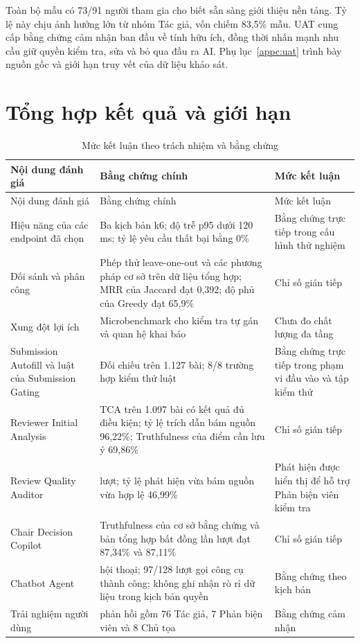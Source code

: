 Toàn bộ mẫu có 73/91 người tham gia cho biết sẵn sàng giới thiệu nền tảng. Tỷ lệ này chịu ảnh hưởng lớn từ nhóm Tác giả, vốn chiếm 83,5\% mẫu. UAT cung cấp bằng chứng cảm nhận ban đầu về tính hữu ích, đồng thời nhấn mạnh nhu cầu giữ quyền kiểm tra, sửa và bỏ qua đầu ra AI. Phụ lục~\ref{appc:uat} trình bày nguồn gốc và giới hạn truy vết của dữ liệu khảo sát.

\section{Tổng hợp kết quả và giới hạn}

\begin{longtable}{|>{\RaggedRight\arraybackslash}p{}|>{\RaggedRight\arraybackslash}p{}|>{\RaggedRight\arraybackslash}p{}|}
  \caption{Mức kết luận theo trách nhiệm và bằng chứng}\label{tab:ch4-demo-synthesis}\\[0.5\baselineskip]
  \hline
  Nội dung đánh giá & Bằng chứng chính & Mức kết luận \\ \hline
  \endfirsthead
  \hline
  Nội dung đánh giá & Bằng chứng chính & Mức kết luận \\ \hline
  \endhead
  \hline
  \endfoot
  Hiệu năng của các endpoint đã chọn & Ba kịch bản k6; độ trễ p95 dưới 120 ms; tỷ lệ yêu cầu thất bại bằng 0\% & Bằng chứng trực tiếp trong cấu hình thử nghiệm \\ \hline
  Đối sánh và phân công & Phép thử leave-one-out và các phương pháp cơ sở trên dữ liệu tổng hợp; MRR của Jaccard đạt 0,392; độ phủ của Greedy đạt 65,9\% & Chỉ số gián tiếp \\ \hline
  Xung đột lợi ích & Microbenchmark cho kiểm tra tự gán và quan hệ khai báo & Chưa đo chất lượng đa tầng \\ \hline
  Submission Autofill và luật của Submission Gating & Đối chiếu trên 1.127 bài; 8/8 trường hợp kiểm thử luật & Bằng chứng trực tiếp trong phạm vi đầu vào và tập kiểm thử \\ \hline
  Reviewer Initial Analysis & TCA trên 1.097 bài có kết quả đủ điều kiện; tỷ lệ trích dẫn bám nguồn 96,22\%; Truthfulness của điểm cần lưu ý 69,86\% & Chỉ số gián tiếp \\ \hline
  Review Quality Auditor & 3.658 lượt; tỷ lệ phát hiện vừa bám nguồn vừa hợp lệ 46,99\% & Phát hiện được hiển thị để hỗ trợ Phản biện viên kiểm tra \\ \hline
  Chair Decision Copilot & Truthfulness của cơ sở bằng chứng và bản tổng hợp bất đồng lần lượt đạt 87,34\% và 87,11\% & Chỉ số gián tiếp \\ \hline
  Chatbot Agent & 40 hội thoại; 97/128 lượt gọi công cụ thành công; không ghi nhận rò rỉ dữ liệu trong kịch bản quyền & Bằng chứng theo kịch bản \\ \hline
  Trải nghiệm người dùng & 91 phản hồi gồm 76 Tác giả, 7 Phản biện viên và 8 Chủ tọa & Bằng chứng cảm nhận \\ \hline
\end{longtable}

